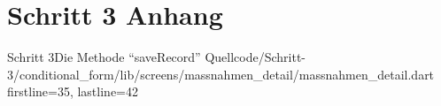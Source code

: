 \chapter{Schritt 3 Anhang} 
\label{appendix:Schritt3Anhang}

\begin{alexlisting}{Schritt 3}{Die Methode \enquote{saveRecord}}
    {Quellcode/Schritt-3/conditional_form/lib/screens/massnahmen_detail/massnahmen_detail.dart}
    {firstline=35, lastline=42}
    \label{lst:Schritt3saveRecord}
\end{alexlisting}